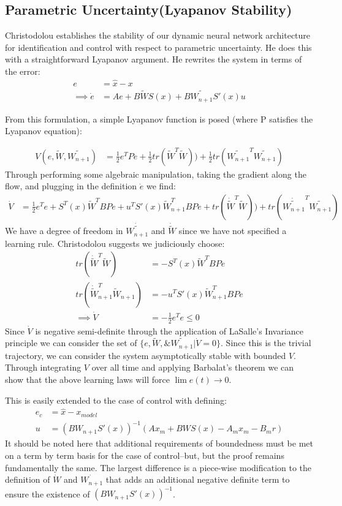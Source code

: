 \documentclass[12pt, letterpaper]{article}
\begin{document}
	\subsection{Parametric Uncertainty(Lyapanov Stability)}
		Christodolou establishes the stability of our dynamic neural network architecture for identification and control with respect to parametric uncertainty. He does this with a straightforward Lyapanov argument. He rewrites the system in terms of the error:
		\begin{align*}
			e&= \hat{x}-x \\
			\implies \dot{e} &= Ae+B\tilde{W}S(x)+B\tilde{W_{n+1}}S'(x)u
		\end{align*}
	
		From this formulation, a simple Lyapanov function is posed (where P satisfies the Lyapanov equation):
		
		\begin{align*}
		V(e, \tilde{W}, \tilde{W_{n+1}}) &= \frac{1}{2}e^{T}Pe+\frac{1}{2}tr(\tilde{W}^{T}\tilde{W})) +\frac{1}{2}tr(\tilde{W_{n+1}}^{T}\tilde{W_{n+1}})
		\end{align*}
		Through performing some algebraic manipulation, taking the gradient along the flow, and plugging in the definition $\dot{e}$ we find:
		\begin{align*}
			\dot{V} &= \frac{1}{2}e^{T}e +S^{T}(x)\tilde{W}^{T}BPe +u^TS'(x)\tilde{W}_{n+1}^{T}BPe+tr(\dot{\tilde{W}}^{T}\tilde{W})) +tr(\dot{\tilde{W_{n+1}}}^{T}\tilde{W_{n+1}})
		\end{align*}
	We have a degree of freedom in $\dot{\tilde{W_{n+1}}}$ and $\dot{\tilde{W}}$ since we have not specified a learning rule. Christodolou suggests we judiciously choose:
	\begin{align*}
		tr(\dot{\tilde{W}}^{T}\tilde{W}) &= -S^{T}(x)\tilde{W}^{T}BPe \\
		tr(\dot{\tilde{W}}_{n+1}^{T}\tilde{W}_{n+1}) &= -u^TS'(x)\tilde{W}_{n+1}^{T}BPe\\
		\implies \dot{V} &= -\frac{1}{2}e^{T}e \leq 0
	\end{align*}
	Since $\dot{V}$ is negative semi-definite through the application of LaSalle's Invariance principle we can consider the set of $\{e, \tilde{W},\& \tilde{W_{n+1}}| \dot{V}=0\}$. Since this is the trivial trajectory, we can consider the system asymptotically stable with bounded $V$. Through integrating $V$ over all time and applying Barbalat's theorem we can show that the above learning laws will force $\lim{e(t)} \to 0$.
	
	This is easily extended to the case of control with defining:
	\begin{align*}
		e_{c} &= \hat{x}-x_{model} \\
		u &= (BW_{n+1}S'(x))^{-1}(Ax_{m}+BWS(x)-A_{m}x_{m}-B_{m}r)
	\end{align*}
	It should be noted here that additional requirements of boundedness must be met on a term by term basis for the case of control--but, but the proof remains fundamentally the same. The largest difference is a piece-wise modification to the definition of $\dot{W}$ and $\dot{W_{n+1}}$ that adds an additional negative definite term to ensure the existence of $(BW_{n+1}S'(x))^{-1}$.
	
\end{document}
